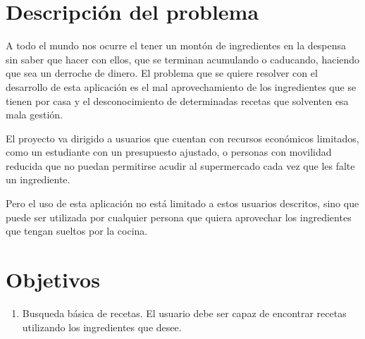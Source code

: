 \section{Descripción del problema}
A todo el mundo nos ocurre el tener un montón de ingredientes en la despensa sin saber que hacer con ellos, que se terminan acumulando o caducando, haciendo que sea un derroche de dinero. El problema que se quiere resolver con el desarrollo de esta aplicación es el mal aprovechamiento de los ingredientes que se tienen por casa y el desconocimiento de determinadas recetas que solventen esa mala gestión.

El proyecto va dirigido a usuarios que cuentan con recursos económicos limitados, como un estudiante con un presupuesto ajustado, o personas con movilidad reducida que no puedan permitirse acudir al supermercado cada vez que les falte un ingrediente. 

Pero el uso de esta aplicación no está limitado a estos usuarios descritos, sino que puede ser utilizada por cualquier persona que quiera aprovechar los ingredientes que tengan sueltos por la cocina.

\section{Objetivos}
\begin{enumerate} 
    \item Busqueda básica de recetas. El usuario debe ser capaz de encontrar recetas utilizando los ingredientes que desee.
\end{enumerate}